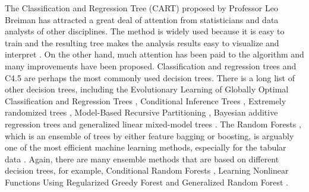 The Classification and Regression Tree (CART) proposed by Professor Leo Breiman \citep{1984Classification} has attracted a great deal of attention from statisticians and data analysts of other disciplines. The method is widely used because it is easy to train and the resulting tree makes the analysis results easy to visualize and interpret \citep{2014Learning}. On the other hand, much attention has been paid to the algorithm and many improvements have been proposed. Classification and regression trees  \citep[{CART}]{quinlan1987decision} and {C4.5} \citep{quinlan1993program} are perhaps the most commonly used decision trees. There is a long list of other decision trees, including the Evolutionary Learning of Globally Optimal Classification and Regression Trees  \citep[{EVT}]{Grubinger2014ectree},  Conditional Inference Trees \citep[CT]{hothorn2006unbiased}, Extremely randomized trees \citep[{ERT}]{2006Extremely}, Model-Based Recursive Partitioning  \citep[{MOB}]{zeileis2015parties}, Bayesian additive regression trees \citep[({BART}) ]{maia2022gp} and generalized linear mixed-model trees  \citep[{glmertree}]{2020Generalized}.  The Random Forests \citep[RF]{breiman2001random}, which is an ensemble of trees by either feature bagging or boosting,  is arguably one of the most efficient machine learning methods, especially for the tabular data \citep{tabularDATA}. Again, there are many ensemble methods that are based on different decision trees, for example, Conditional Random Forests \citep[{cforest}]{hothorn2006unbiased}, Learning Nonlinear Functions Using Regularized Greedy Forest \citep[{RGF}]{2014Learning} and Generalized Random Forest \citep[{GRF}]{athey2019generalized}.

